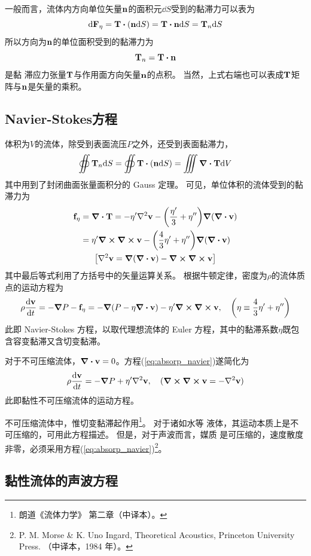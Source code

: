 \documentclass[UTF8]{ctexbook}
\begin{document}
一般而言，流体内方向单位矢量$\vb{n}$的面积元$\dd S$受到的黏滞力可以表为
$$\dd \vb{F}_\eta = \vb{T} \vdot \qty(\vb{n} \dd S) = \vb{T}\vdot \vb{n} \dd S = \vb{T}_n \dd S$$
所以方向为$\vb{n}$的单位面积受到的黏滞力为
$$\vb{T}_n = \vb{T}\vdot \vb{n}$$
是黏 滞应力张量$\vb{T}$与作用面方向矢量$\vb{n}$的点积。
当然，上式右端也可以表成$\vb{T}$矩阵与$\vb{n}$是矢量的乘积。

\subsection{Navier-Stokes方程}
 体积为$V$的流体，除受到表面流压$P$之外，还受到表面黏滞力，
 $$\oiint \vb{T}_n \dd S = \oiint \vb{T} \vdot (\vb{n}\dd S) = \iiint \div \vb{T} \dd V$$
  其中用到了封闭曲面张量面积分的 Gauss 定理。
  可见，单位体积的流体受到的黏滞力为
 \begin{gather*}
\begin{align*}
	\vb{f}_\eta &= \div \vb{T} = -\eta' \laplacian \vb{v} -\qty(\frac{\eta'}{3}+\eta'')\grad\qty(\div \vb{v})\\
	& = \eta' \curl \curl \vb{v} - \qty(\frac{4}{3}\eta' + \eta'')\grad \qty(\div \vb{v})
\end{align*} \\
\qty[\laplacian \vb{v} = \grad(\div \vb{v}) - \curl \curl \vb{v}]
\end{gather*}
 其中最后等式利用了方括号中的矢量运算关系。
 根据牛顿定律，密度为$\rho$的流体质点的运动方程为
 \begin{align}
	 \rho \dv{\vb{v}}{t} = -\grad P - \vb{f}_\eta = -\grad(P-\eta \div \vb{v}) - \eta' \curl \curl \vb{v} \qc \qty(\eta\equiv \frac43 \eta'+\eta'')
	 \label{eq:absorp_navier}
 \end{align}
 此即 Navier-Stokes 方程，以取代理想流体的 Euler 方程，其中的黏滞系数$\eta$既包含容变黏滞又含切变黏滞。

 对于不可压缩流体，$\div \vb{v} = 0$。方程(\ref{eq:absorp_navier})遂简化为
 $$\rho \dv{\vb{v}}{t} = -\grad P + \eta' \laplacian \vb{v}\qc (\curl \curl \vb{v} = -\laplacian \vb{v})$$
  此即黏性不可压缩流体的运动方程。
  
  不可压缩流体中，惟切变黏滞起作用\footnote{朗道《流体力学》 第二章（中译本）。}。
   对于诸如水等 液体，其运动本质上是不可压缩的，可用此方程描述。
   但是，对于声波而言，媒质 是可压缩的，速度散度非零，必须采用方程(\ref{eq:absorp_navier})\footnote{P. M. Morse \& K. Uno Ingard, Theoretical Acoustics, Princeton University Press. （中译本，1984 年）。}。
   \subsection{黏性流体的声波方程}
 
\end{document}

